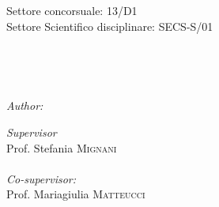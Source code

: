 \documentclass[
12pt, %
english, %
onehalfspacing,%
headsepline, %
]{MastersDoctoralThesis} %
\author{Giada \textsc{Spaccapanico Proietti}} %
\numberwithin{equation}{chapter} %
\begin{document}
\frontmatter %

\pagestyle{plain} %


\begin{titlepage}

\begin{center}
	{\scshape \large \univname\par}
	{\scshape \large \deptname\par}\vspace{0.5cm} %
	{\scshape  \degreename\par}\vspace{1cm} %
	
	{ Settore concorsuale: 13/D1}\\
		{ Settore Scientifico disciplinare: SECS-S/01}\vspace{1cm}
		
		\HRule \\[0.4cm] %
		{\LARGE \bfseries \ttitle\par}\vspace{0.2cm} %
		\HRule \\[1.5cm] %
		

		\begin{flushleft} 
					\begin{minipage}[t]{0.5\textwidth}
			\emph{Author:}\\
			\authorname %
				\end{minipage}
		\end{flushleft}
\vspace{-52px}
		\begin{flushright} 
	\begin{minipage}[t]{0.4\textwidth}
				
				\emph{Supervisor}\\
				Prof. Stefania \textsc{Mignani}\\
				\\
				\emph{Co-supervisor:} \\
				Prof. Mariagiulia \textsc{Matteucci}
	\end{minipage}\\[3cm]
				\end{flushright}
		\vfill
		\vfill
		

\end{center}
\end{titlepage}
\end{document}

